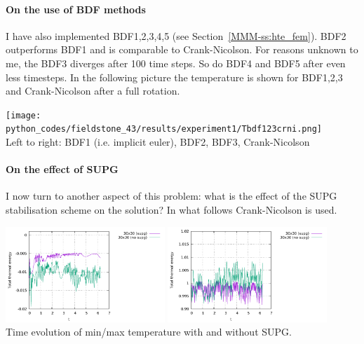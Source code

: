 \paragraph{On the use of BDF methods} I have also implemented 
BDF1,2,3,4,5  (see Section~\ref{MMM-ss:hte_fem}). 
BDF2 outperforms BDF1 and is comparable to Crank-Nicolson. 
For reasons unknown to me, the BDF3 diverges after 100 time steps. So do 
BDF4 and BDF5 after even less timesteps. In the following picture the temperature is shown for 
BDF1,2,3 and Crank-Nicolson after a full rotation.

\begin{center}
\texttt{[image: python\_codes/fieldstone\_43/results/experiment1/Tbdf123crni.png]}\\
{\captionfont Left to right: BDF1 (i.e. implicit euler), BDF2, BDF3, Crank-Nicolson}
\end{center}

\paragraph{On the effect of SUPG} 
I now turn to another aspect of this problem: what is the effect of the SUPG stabilisation 
scheme on the solution? In what follows Crank-Nicolson is used. 

\begin{center}
\includegraphics[width=6cm]{python_codes/fieldstone_43/results/experiment1/Tmin_supg}
\includegraphics[width=6cm]{python_codes/fieldstone_43/results/experiment1/Tmax_supg}\\
{\captionfont Time evolution of min/max temperature with and without SUPG.} 
\end{center}

